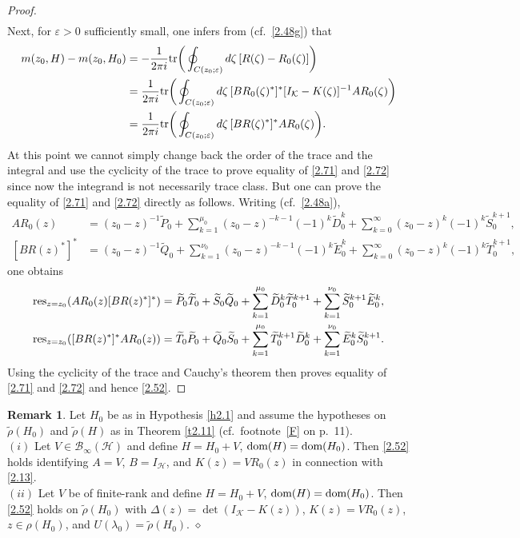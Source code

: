 \documentclass[reqno,10pt, centertags]{amsart}
\newcommand{\cB}{{\mathcal B}}
\newcommand{\cH}{{\mathcal H}}
\newcommand{\cK}{{\mathcal K}}
\newcommand{\no}{\nonumber}
\newcommand{\lb}{\label}
\newcommand{\f}{\frac}
\newcommand{\wti}{\widetilde}
\newcommand{\tr}{\text{\rm{tr}}}
\newcommand{\dom}{\text{\rm{dom}}}
\numberwithin{equation}{section}
\theoremstyle{definition}
\newtheorem{remark}[theorem]{Remark}
\begin{document}
\begin{proof}
\begin{align}
\end{align}
Next, for $\varepsilon>0$ sufficiently small, one infers from
\cite[p.\ 178]{Ka80} (cf.\ \eqref{2.48g}) that
\begin{align}
m(z_0,H)-m(z_0,H_0)&=-\f{1}{2\pi i} \tr\bigg(
\oint_{C(z_0; \varepsilon) } d\zeta \, [R(\zeta)-R_0(\zeta)]\bigg)
\no
\\
&= \f{1}{2\pi i} \tr\bigg( \oint_{C(z_0; \varepsilon) } d\zeta \,
[BR_0(\zeta)^*]^*
[I_{\cK}-K(\zeta)]^{-1} AR_0(\zeta) \bigg) \no \\
&= \f{1}{2\pi i} \tr\bigg( \oint_{C(z_0; \varepsilon) } d\zeta \,
[BR(\zeta)^*]^* AR_0(\zeta) \bigg). \lb{2.72}
\end{align}
At this point we cannot simply change back the order of the trace
and the integral and use the cyclicity of the trace to prove equality of
\eqref{2.71} and
\eqref{2.72} since now the integrand is not necessarily trace class.
But one can prove the equality of \eqref{2.71} and \eqref{2.72} directly
as follows. Writing (cf.\ \eqref{2.48a}),
\begin{align}
AR_0(z) &= (z_0-z)^{-1}\wti
P_0+\sum_{k=1}^{\mu_0}(z_0-z)^{-k-1}(-1)^k \wti D_0^k +
\sum_{k=0}^{\infty} (z_0-z)^k (-1)^k \wti S_0^{k+1}, \lb{2.73}
\\  [BR(z)^*]^* &= (z_0-z)^{-1}\wti Q_0
+\sum_{k=1}^{\nu_0}(z_0-z)^{-k-1}(-1)^k \wti E_0^k +
\sum_{k=0}^{\infty} (z_0-z)^k (-1)^k \wti T_0^{k+1}, \lb{2.74}
\end{align}
one obtains
\begin{align}
\text{\rm res}_{z=z_0}(AR_0(z)[BR(z)^*]^*)&=\wti P_0\wti T_0+\wti
S_0\wti Q_0+\sum_{k=1}^{\mu_0} \wti D_0^k\wti T_0^{k+1} +
\sum_{k=1}^{\nu_0} \wti S_0^{k+1}\wti E_0^{k}, \lb{2.75} \\
\text{\rm res}_{z=z_0}([BR(z)^*]^*AR_0(z))&=\wti T_0\wti P_0+\wti
Q_0\wti S_0+\sum_{k=1}^{\mu_0} \wti T_0^{k+1}\wti D_0^k +
\sum_{k=1}^{\nu_0} \wti E_0^{k}\wti S_0^{k+1}. \lb{2.76}
\end{align}
Using the cyclicity of the trace and Cauchy's theorem then
proves equality of \eqref{2.71} and \eqref{2.72} and hence
\eqref{2.52}.
\end{proof}

\begin{remark} \lb{r2.12}
Let $H_0$ be as in Hypothesis \ref{h2.1} and assume the hypotheses on 
$\widetilde \rho(H_0)$ and $\widetilde \rho(H)$ as in Theorem \ref{t2.11} 
(cf.\ footnote~\ref{F} on p.~11). \\
$(i)$ Let $V\in\cB_{\infty}(\cH)$ and define $H=H_0+V$,
$\dom(H)=\dom(H_0)$. Then \eqref{2.52} holds identifying $A=V$,
$B=I_{\cH}$, and $K(z)=VR_0(z)$ in connection with \eqref{2.13}. \\
$(ii)$ Let $V$ be of finite-rank and define $H=H_0+V$,
$\dom(H)=\dom(H_0)$. Then \eqref{2.52} holds on $\wti \rho (H_0)$
with $\Delta(z)=\det(I_{\cK}-K(z))$, $K(z)=VR_0(z)$, $z\in\rho(H_0)$, and
$U(\lambda_0)=\wti \rho (H_0)$. \hfill $\diamond$
\end{remark}
\end{document}

